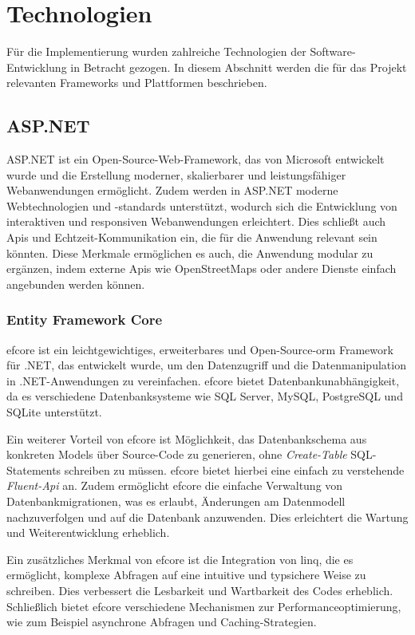 \section{Technologien}

Für die Implementierung wurden zahlreiche Technologien der Software-Entwicklung in Betracht gezogen. In diesem Abschnitt werden die für das Projekt relevanten Frameworks und Plattformen beschrieben.

\subsection{ASP.NET}

ASP.NET ist ein Open-Source-Web-Framework, das von Microsoft entwickelt wurde und die Erstellung moderner, skalierbarer und leistungsfähiger Webanwendungen ermöglicht. Zudem werden in ASP.NET moderne Webtechnologien und -standards unterstützt, wodurch sich die Entwicklung von interaktiven und responsiven Webanwendungen erleichtert. Dies schließt auch Apis und Echtzeit-Kommunikation ein, die für die Anwendung relevant sein könnten. Diese Merkmale ermöglichen es auch, die Anwendung modular zu ergänzen, indem externe Apis wie OpenStreetMaps oder andere Dienste einfach angebunden werden können. \autocite{MicrosoftLearn:AspNet}

\subsubsection{Entity Framework Core}

\ac{efcore} ist ein leichtgewichtiges, erweiterbares und Open-Source-\ac{orm} Framework für .NET, das entwickelt wurde, um den Datenzugriff und die Datenmanipulation in .NET-Anwendungen zu vereinfachen. \ac{efcore} bietet Datenbankunabhängigkeit, da es verschiedene Datenbanksysteme wie SQL Server, MySQL, PostgreSQL und SQLite unterstützt.

Ein weiterer Vorteil von \ac{efcore} ist Möglichkeit, das Datenbankschema aus konkreten Models über Source-Code zu generieren, ohne \textit{Create-Table} SQL-Statements schreiben zu müssen. \ac{efcore} bietet hierbei eine einfach zu verstehende \textit{Fluent-Api} an. Zudem ermöglicht \ac{efcore} die einfache Verwaltung von Datenbankmigrationen, was es erlaubt, Änderungen am Datenmodell nachzuverfolgen und auf die Datenbank anzuwenden. Dies erleichtert die Wartung und Weiterentwicklung erheblich.

Ein zusätzliches Merkmal von \ac{efcore} ist die Integration von \ac{linq}, die es ermöglicht, komplexe Abfragen auf eine intuitive und typsichere Weise zu schreiben. Dies verbessert die Lesbarkeit und Wartbarkeit des Codes erheblich. Schließlich bietet \ac{efcore} verschiedene Mechanismen zur Performanceoptimierung, wie zum Beispiel asynchrone Abfragen und Caching-Strategien. \autocite{MicrosoftLearn:EfCore}

